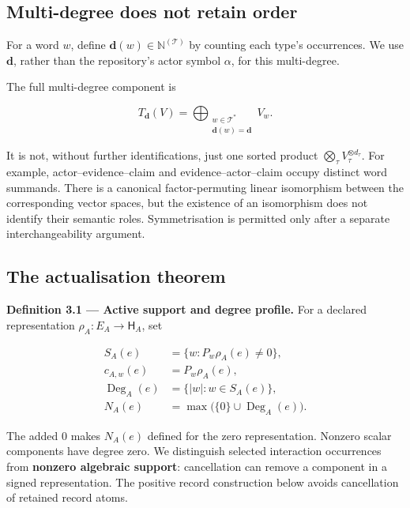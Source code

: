 \documentclass[11pt,a4paper]{article}
\begin{document}
\subsection{Multi-degree does not retain
order}\label{multi-degree-does-not-retain-order}

For a word \(w\), define \(\mathbf d(w)\in\mathbb N^{(\mathcal T)}\) by
counting each type's occurrences. We use \(\mathbf d\), rather than the
repository's actor symbol \(\alpha\), for this multi-degree.

The full multi-degree component is

\nopagebreak[4]

\[
T_{\mathbf d}(V)
=\bigoplus_{\substack{w\in\mathcal T^*\\\mathbf d(w)=\mathbf d}}V_w.
\]

It is not, without further identifications, just one sorted product
\(\bigotimes_\tau V_\tau^{\otimes d_\tau}\). For example,
actor--evidence--claim and evidence--actor--claim occupy distinct word
summands. There is a canonical factor-permuting linear isomorphism
between the corresponding vector spaces, but the existence of an
isomorphism does not identify their semantic roles. Symmetrisation is
permitted only after a separate interchangeability argument.

\subsection{The actualisation theorem}\label{the-actualisation-theorem}


\textbf{Definition 3.1 --- Active support and degree profile.} For a
declared representation \(\rho_A:E_A\to\mathsf H_A\), set

\nopagebreak[4]

\[
\begin{aligned}
S_A(e)&=\{w:P_w\rho_A(e)\neq0\},\\
c_{A,w}(e)&=P_w\rho_A(e),\\
\operatorname{Deg}_A(e)&=\{|w|:w\in S_A(e)\},\\
N_A(e)&=\max\bigl(\{0\}\cup\operatorname{Deg}_A(e)\bigr).
\end{aligned}
\]

The added \(0\) makes \(N_A(e)\) defined for the zero representation.
Nonzero scalar components have degree zero. We distinguish selected
interaction occurrences from \textbf{nonzero algebraic support}:
cancellation can remove a component in a signed representation. The
positive record construction below avoids cancellation of retained
record atoms.
\end{document}
